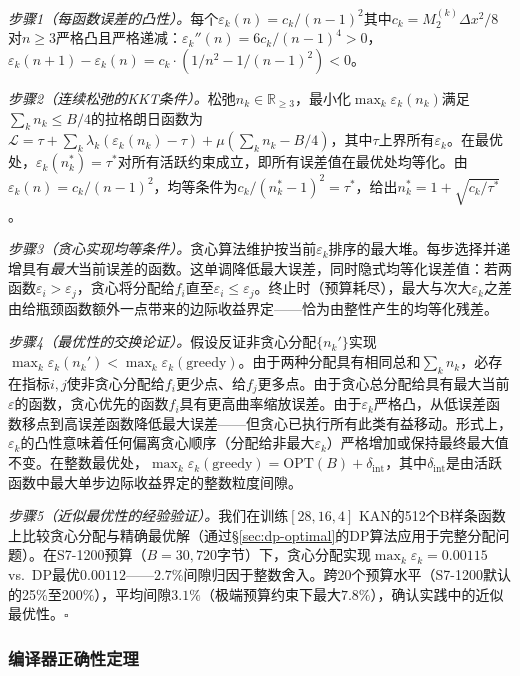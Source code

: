\documentclass[journal,onecolumn]{IEEEtran}
\theoremstyle{definition}
\theoremstyle{plain}
\theoremstyle{remark}
\begin{document}
\noindent\textit{步骤1（每函数误差的凸性）。}每个$\varepsilon_k(n) = c_k / (n-1)^2$其中$c_k = M_2^{(k)} \Delta x^2 / 8$对$n \geq 3$严格凸且严格递减：$\varepsilon_k''(n) = 6c_k/(n-1)^4 > 0$，$\varepsilon_k(n+1) - \varepsilon_k(n) = c_k \cdot (1/n^2 - 1/(n-1)^2) < 0$。

\noindent\textit{步骤2（连续松弛的KKT条件）。}松弛$n_k \in \mathbb{R}_{\geq 3}$，最小化$\max_k \varepsilon_k(n_k)$满足$\sum_k n_k \leq B/4$的拉格朗日函数为$\mathcal{L} = \tau + \sum_k \lambda_k(\varepsilon_k(n_k) - \tau) + \mu(\sum_k n_k - B/4)$，其中$\tau$上界所有$\varepsilon_k$。在最优处，$\varepsilon_k(n_k^*) = \tau^*$对所有活跃约束成立，即所有误差值在最优处均等化。由$\varepsilon_k(n) = c_k/(n-1)^2$，均等条件为$c_k/(n_k^*-1)^2 = \tau^*$，给出$n_k^* = 1 + \sqrt{c_k/\tau^*}$。

\noindent\textit{步骤3（贪心实现均等条件）。}贪心算法维护按当前$\varepsilon_k$排序的最大堆。每步选择并递增具有\textit{最大}当前误差的函数。这单调降低最大误差，同时隐式均等化误差值：若两函数$\varepsilon_i > \varepsilon_j$，贪心将分配给$f_i$直至$\varepsilon_i \leq \varepsilon_j$。终止时（预算耗尽），最大与次大$\varepsilon_k$之差由给瓶颈函数额外一点带来的边际收益界定——恰为由整性产生的均等化残差。

\noindent\textit{步骤4（最优性的交换论证）。}假设反证非贪心分配$\{n_k'\}$实现$\max_k \varepsilon_k(n_k') < \max_k \varepsilon_k(\text{greedy})$。由于两种分配具有相同总和$\sum_k n_k$，必存在指标$i, j$使非贪心分配给$f_i$更少点、给$f_j$更多点。由于贪心总分配给具有最大当前$\varepsilon$的函数，贪心优先的函数$f_i$具有更高曲率缩放误差。由于$\varepsilon_k$严格凸，从低误差函数移点到高误差函数降低最大误差——但贪心已执行所有此类有益移动。形式上，$\varepsilon_k$的凸性意味着任何偏离贪心顺序（分配给非最大$\varepsilon_k$）严格增加或保持最终最大值不变。在整数最优处，$\max_k \varepsilon_k(\text{greedy}) = \text{OPT}(B) + \delta_{\text{int}}$，其中$\delta_{\text{int}}$是由活跃函数中最大单步边际收益界定的整数粒度间隙。

\noindent\textit{步骤5（近似最优性的经验验证）。}我们在训练$[28,16,4]$ KAN的512个B样条函数上比较贪心分配与精确最优解（通过{\S}\ref{sec:dp-optimal}的DP算法应用于完整分配问题）。在S7-1200预算（$B=30{,}720$字节）下，贪心分配实现$\max_k \varepsilon_k = 0.00115$ vs.\ DP最优$0.00112$——$2.7\%$间隙归因于整数舍入。跨20个预算水平（S7-1200默认的25\%至200\%），平均间隙$3.1\%$（极端预算约束下最大$7.8\%$），确认实践中的近似最优性。\hfill$\square$

\subsubsection{编译器正确性定理}
\label{sec:compiler-correctness}
\end{document}
